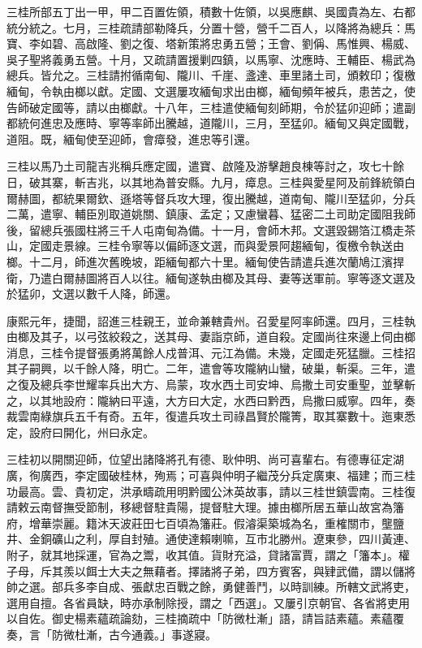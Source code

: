 \begin{pinyinscope}
三桂所部五丁出一甲，甲二百置佐領，積數十佐領，以吳應麒、吳國貴為左、右都統分統之。七月，三桂疏請部勒降兵，分置十營，營千二百人，以降將為總兵：馬寶、李如碧、高啟隆、劉之復、塔新策將忠勇五營；王會、劉偁、馬惟興、楊威、吳子聖將義勇五營。十月，又疏請置援剿四鎮，以馬寧、沈應時、王輔臣、楊武為總兵。皆允之。三桂請拊循南甸、隴川、千崖、盞達、車里諸土司，頒敕印；復檄緬甸，令執由榔以獻。定國、文選屢攻緬甸求出由榔，緬甸頻年被兵，患苦之，使告師破定國等，請以由榔獻。十八年，三桂遣使緬甸刻師期，令於猛卯迎師；遣副都統何進忠及應時、寧等率師出騰越，道隴川，三月，至猛卯。緬甸又與定國戰，道阻。既，緬甸使至迎師，會瘴發，進忠等引還。

三桂以馬乃土司龍吉兆稱兵應定國，遣寶、啟隆及游擊趙良棟等討之，攻七十餘日，破其寨，斬吉兆，以其地為普安縣。九月，瘴息。三桂與愛星阿及前鋒統領白爾赫圖，都統果爾欽、遜塔等督兵攻大理，復出騰越，道南甸、隴川至猛卯，分兵二萬，遣寧、輔臣別取道姚關、鎮康、孟定；又慮蠻暮、猛密二土司助定國阻我師後，留總兵張國柱將三千人屯南甸為備。十一月，會師木邦。文選毀錫箔江橋走茶山，定國走景線。三桂令寧等以偏師逐文選，而與愛景阿趨緬甸，復檄令執送由榔。十二月，師進次舊晚坡，距緬甸都六十里。緬甸使告請遣兵進次蘭鳩江濱捍衛，乃遣白爾赫圖將百人以往。緬甸遂執由榔及其母、妻等送軍前。寧等逐文選及於猛卯，文選以數千人降，師還。

康熙元年，捷聞，詔進三桂親王，並命兼轄貴州。召愛星阿率師還。四月，三桂執由榔及其子，以弓弦絞殺之，送其母、妻詣京師，道自殺。定國尚往來邊上伺由榔消息，三桂令提督張勇將萬餘人戍普洱、元江為備。未幾，定國走死猛臘。三桂招其子嗣興，以千餘人降，明亡。二年，遣會等攻隴納山蠻，破巢，斬渠。三年，遣之復及總兵李世耀率兵出大方、烏蒙，攻水西土司安坤、烏撒土司安重聖，並擊斬之，以其地設府：隴納曰平遠，大方曰大定，水西曰黔西，烏撒曰威寧。四年，奏裁雲南綠旗兵五千有奇。五年，復遣兵攻土司祿昌賢於隴箐，取其寨數十。迤東悉定，設府曰開化，州曰永定。

三桂初以開關迎師，位望出諸降將孔有德、耿仲明、尚可喜輩右。有德專征定湖廣，徇廣西，李定國破桂林，殉焉；可喜與仲明子繼茂分兵定廣東、福建；而三桂功最高。雲、貴初定，洪承疇疏用明黔國公沐英故事，請以三桂世鎮雲南。三桂復請敕云南督撫受節制，移總督駐貴陽，提督駐大理。據由榔所居五華山故宮為籓府，增華崇麗。籍沐天波莊田七百頃為籓莊。假濬渠築城為名，重榷關市，壟鹽井、金銅礦山之利，厚自封殖。通使達賴喇嘛，互市北勝州。遼東參，四川黃連、附子，就其地採運，官為之鬻，收其值。貨財充溢，貸諸富賈，謂之「籓本」。權子母，斥其羨以餌士大夫之無藉者。擇諸將子弟，四方賓客，與肄武備，謂以儲將帥之選。部兵多李自成、張獻忠百戰之餘，勇健善鬥，以時訓練。所轄文武將吏，選用自擅。各省員缺，時亦承制除授，謂之「西選」。又屢引京朝官、各省將吏用以自佐。御史楊素蘊疏論劾，三桂摘疏中「防微杜漸」語，請旨詰素蘊。素蘊覆奏，言「防微杜漸，古今通義。」事遂寢。


\end{pinyinscope}
